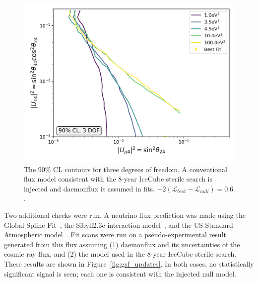 \documentclass[main.tex]{subfiles}
\begin{document}
\begin{figure}  
    \centering
    \includegraphics[width=0.7\linewidth]{figures/joint_daemon_inject_barr_Realization_Asimov_sterile_0_cl0.9_dof3.png}
    \caption{The 90\% CL contours for three degrees of freedom. A conventional flux model consistent with the 8-year IceCube sterile search is injected and daemonflux is assumed in fits. $-2(\mathcal{L}_{best}-\mathcal{L}_{null})=0.6$.}\label{fig:daemon_midmodel}
\end{figure}

Two additional checks were run. 
A neutrino flux prediction was made using the Global Spline Fit~\cite{dembinski2017datadriven}, the Sibyll2.3c interaction model~\cite{Riehn:2017mfm}, and the US Standard Atmospheric model~\cite{united1976u}. 
Fit scans were run on a pseudo-experimental result generated from this flux assuming (1) daemonflux and its uncertainties of the cosmic ray flux, and (2) the model used in the 8-year IceCube sterile search. 
These results are shown in Figure~\ref{fig:gsf_updates}. 
In both cases, no statistically significant signal is seen; each one is consistent with the injected null model. 
\end{document}
